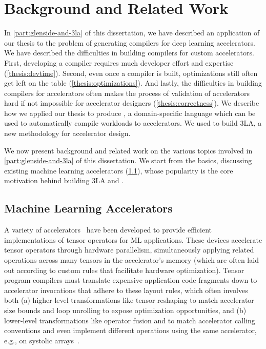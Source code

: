   
\chapter{Background and Related Work}
\label{chapter:part1-background}

In \cref{part:glenside-and-3la}
  of this dissertation,
  we have described an application
  of our thesis
  to the problem of
  generating compilers
  for deep learning accelerators.
We have described 
  the difficulties in building
  compilers
  for custom accelerators.
First, developing a compiler
  requires much
  developer effort
  and expertise
  (\cref{thesis:devtime}).
Second,
  even once a compiler is built,
  optimizations still often
  get left on the table
  (\cref{thesis:optimizations}).
And lastly,
  the difficulties in
  building compilers
  for accelerators
  often makes the process
  of validation
  of accelerators
  hard if not impossible
  for accelerator designers
  (\cref{thesis:correctness}).
We describe how
  we applied our thesis
  to produce
  \g,
  a domain-specific language
  which can be used to 
  automatically compile
  workloads to accelerators.
We used \g to build
  3LA, a new methodology
  for accelerator design.

We now present background
  and related work
  on the various topics
  involved in
  \cref{part:glenside-and-3la}
  of this dissertation.
We start from the basics, discussing
  existing
  machine learning accelerators
  (\cref{sec:part1:relatedwork:accelerators}),
  whose popularity
  is the core motivation
  behind building 3LA and \g.

\section{Machine Learning Accelerators}
\label{sec:part1:relatedwork:accelerators}

A variety of accelerators~\cite{
    jouppi2017tpu, chen2016eyeriss, moreau2018vta, markidis2018tensorcore, nvdla,
    genc2021gemmini}
  have been developed 
  to provide efficient implementations
  of tensor operators for ML applications.
These devices accelerate tensor operators 
  through hardware parallelism, 
  simultaneously applying related operations
  across many tensors in the accelerator's memory (which are often laid out according to custom rules that facilitate hardware optimization).
Tensor program compilers must translate
  expensive application code fragments
  down to accelerator invocations that
  adhere to these layout rules,
  which often involves both
  (a) higher-level transformations like
  tensor reshaping to match accelerator size bounds and
  loop unrolling to expose optimization opportunities, and
  (b) lower-level transformations like
  operator fusion and 
  to match accelerator calling conventions and
  even implement different operations
  using the same accelerator,
  e.g., on systolic arrays~\cite{im2col, jia2014semantic}.
  

